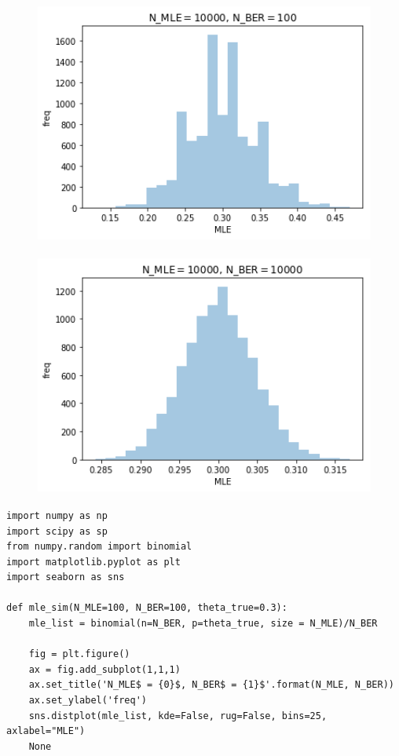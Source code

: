 \documentclass[11pt,a4paper,dvipdfmx]{article}
\theoremstyle{plain}
\newcommand{\1}{\mbox{1}\hspace{-0.25em}\mbox{l}}
\begin{document}
\begin{figure}[H]
  \centering
    \includegraphics[height=8cm]{image/fig1.png}
    \label{fig:fig1}
\end{figure}
\begin{figure}[H]
  \centering
    \includegraphics[height=8cm]{image/fig2.png}
    \label{fig:fig2}
\end{figure}

\begin{lstlisting}
import numpy as np
import scipy as sp
from numpy.random import binomial
import matplotlib.pyplot as plt
import seaborn as sns

def mle_sim(N_MLE=100, N_BER=100, theta_true=0.3):
    mle_list = binomial(n=N_BER, p=theta_true, size = N_MLE)/N_BER

    fig = plt.figure()
    ax = fig.add_subplot(1,1,1)
    ax.set_title('N_MLE$ = {0}$, N_BER$ = {1}$'.format(N_MLE, N_BER))
    ax.set_ylabel('freq')
    sns.distplot(mle_list, kde=False, rug=False, bins=25, axlabel="MLE")
    None
\end{lstlisting}
\end{document}
